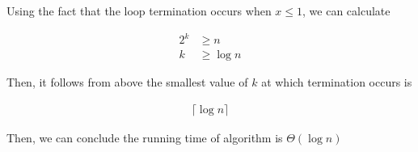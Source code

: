 \documentclass[12pt]{article}
\begin{document}
\begin{enumerate}[a.]
\begin{mdframed}
        Using the fact that the loop termination occurs when $x \leq 1$, we can
        calculate

        \begin{align}
            2^k &\geq n\\
            k &\geq \log n
        \end{align}

        \bigskip

        Then, it follows from above the smallest value of $k$ at which termination occurs
        is

        \begin{align}
            \lceil \log n \rceil
        \end{align}

        \bigskip

        Then, we can conclude the running time of algorithm is $\Theta (\log n)$


    \end{mdframed}


\end{enumerate}
\end{document}
